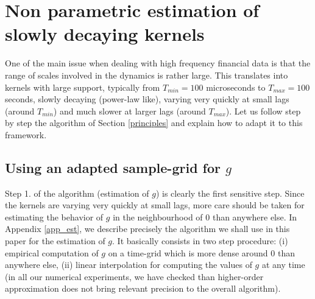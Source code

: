 \documentclass[a4paper,11pt]{article}
\newtheorem{remark}{Remark}[section]
\newcommand{\E}{\mathbb{E}}
\begin{document}



\section{Non parametric estimation of slowly decaying kernels}
\label{s2}
\label{plkernels}
One of the main issue when dealing with high frequency financial data is that the range of scales involved in the dynamics is rather large. This translates into kernels with large support,
typically from $T_{min}=100$ microseconds to $T_{max}=100$ seconds, slowly decaying (power-law like),
varying very quickly at small lags (around $T_{min}$) and much slower at larger lags (around $T_{max}$).
Let us follow step by step the algorithm of Section \ref{principles} and explain how to adapt it to this
framework.


\subsection{Using an adapted sample-grid for $g$}
\label{linearinterp}
Step 1. of the algorithm (estimation of $g$) is clearly the first sensitive step.
Since the kernels are varying very quickly at small lags, more care should be taken for estimating the behavior of $g$ in the neighbourhood of 0 than anywhere else.
In Appendix \ref{app_est}, we describe precisely the algorithm we shall use in this paper for the estimation of $g$. It basically consists in two step procedure: (i) empirical computation of $g$ on a time-grid which is more dense around 0 than anywhere else, (ii) linear interpolation for computing the values of $g$ at any time (in all our numerical experiments, we have checked than higher-order approximation does not bring relevant precision to the overall algorithm).
\end{document}
